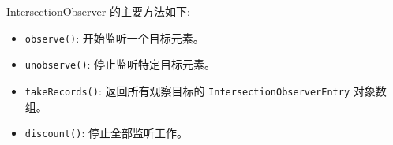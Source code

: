 IntersectionObserver 的主要方法如下:
\begin{itemize}
  \item \texttt{observe()}: 开始监听一个目标元素。
  \item \texttt{unobserve()}: 停止监听特定目标元素。
  \item \texttt{takeRecords()}: 返回所有观察目标的 \texttt{IntersectionObserverEntry} 对象数组。
  \item \texttt{discount()}: 停止全部监听工作。
\end{itemize}